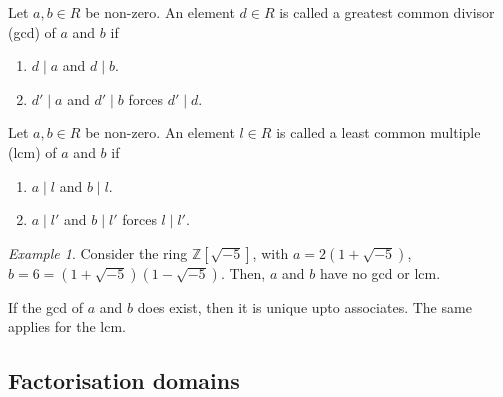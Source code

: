 \documentclass[11pt]{article}
\newcommand{\Z}{\mathbb{Z}}
\theoremstyle{definition}
\theoremstyle{remark}
\newtheorem*{example}{Example}
\numberwithin{equation}{section}
\begin{document}
    \begin{definition}
        Let $a, b \in R$ be non-zero. An element $d \in R$ is called a greatest
        common divisor (gcd) of $a$ and $b$ if \begin{enumerate}
            \itemsep0em
            \item $d\mid a$ and $d\mid b$.
            \item $d'\mid a$ and $d'\mid b$ forces $d'\mid d$.
        \end{enumerate}
    \end{definition}

    \begin{definition}
        Let $a, b \in R$ be non-zero. An element $l \in R$ is called a least common
        multiple (lcm) of $a$ and $b$ if \begin{enumerate}
            \itemsep0em
            \item $a\mid l$ and $b\mid l$.
            \item $a\mid l'$ and $b\mid l'$ forces $l\mid l'$.
        \end{enumerate}
    \end{definition}

    \begin{example}
        Consider the ring $\Z[\sqrt{-5}]$, with $a = 2(1 + \sqrt{-5})$, $b = 6 = (1 +
        \sqrt{-5})(1 - \sqrt{-5})$. Then, $a$ and $b$ have no gcd or lcm.
    \end{example}

    \begin{lemma}
        If the gcd of $a$ and $b$ does exist, then it is unique upto associates. The
        same applies for the lcm.
    \end{lemma}
    

    \subsection{Factorisation domains}
    
\end{document}

